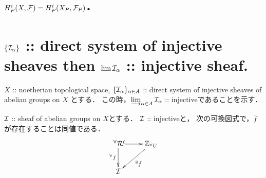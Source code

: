 \documentclass[a4paper]{jsarticle}
\begin{document}
\section{$H^i_P(X, \mathcal{F})=H^i_P(X_P, \mathcal{F}_P)$.} %

\section{$\{\mathcal{I}_{\alpha} \}$ :: direct system of injective sheaves
    then $\lim \mathcal{I}_{\alpha}$ :: injective sheaf.} %
    $X$ :: noetherian topological space,
    $\{ \mathcal{I}_{\alpha} \}_{\alpha \in A}$ :: direct system of injective sheaves of abelian groups on $X$
    とする．
    この時，$\varinjlim_{\alpha \in A} \mathcal{I}_{\alpha}$ :: injectiveであることを示す．

    \begin{Claim}
        $\mathcal{I}$ :: sheaf of abelian groups on $X$とする．
        $\mathcal{I}$ :: injectiveと，
        次の可換図式で，$\bar{f}$が存在することは同値である．
        \[
        \xymatrix
        {
            {}^{\forall}\shR \ar@{^{(}->}[r] \ar[d]_-{{}^{\forall} f}&
            \Z_{{}^{\forall}U} \ar[ld]^-{{}^{\exists} \bar{f}} \\
            \shI
        }
        \]
    \end{Claim}
\end{document}
